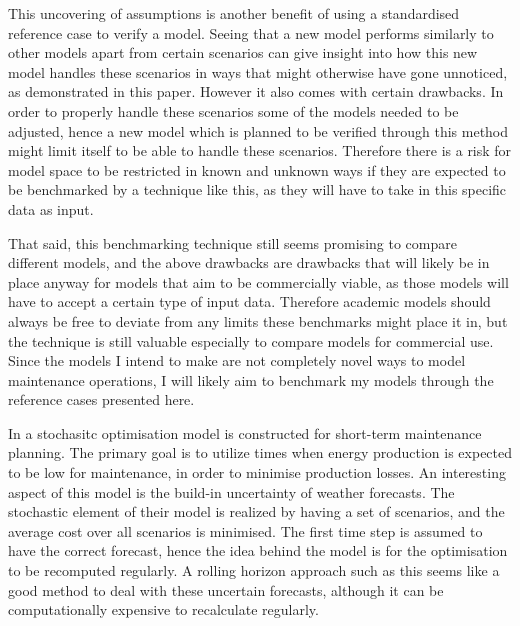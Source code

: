 \documentclass[a4paper,12pt]{article}
\begin{document}
This uncovering of assumptions is another benefit of using a standardised reference case to verify a model. Seeing that a new model performs similarly to other models apart from certain scenarios can give insight into how this new model handles these scenarios in ways that might otherwise have gone unnoticed, as demonstrated in this paper. However it also comes with certain drawbacks. In order to properly handle these scenarios some of the models needed to be adjusted, hence a new model which is planned to be verified through this method might limit itself to be able to handle these scenarios. Therefore there is a risk for model space to be restricted in known and unknown ways if they are expected to be benchmarked by a technique like this, as they will have to take in this specific data as input. 

That said, this benchmarking technique still seems promising to compare different models, and the above drawbacks are drawbacks that will likely be in place anyway for models that aim to be commercially viable, as those models will have to accept a certain type of input data. Therefore academic models should always be free to deviate from any limits these benchmarks might place it in, but the technique is still valuable especially to compare models for commercial use. Since the models I intend to make are not completely novel ways to model maintenance operations, I will likely aim to benchmark my models through the reference cases presented here.  

\bigskip

In \cite{besnard2011stochastic} a stochasitc optimisation model is constructed for short-term maintenance planning. The primary goal is to utilize times when energy production is expected to be low for maintenance, in order to minimise production losses. An interesting aspect of this model is the build-in uncertainty of weather forecasts. The stochastic element of their model is realized by having a set of scenarios, and the average cost over all scenarios is minimised. The first time step is assumed to have the correct forecast, hence the idea behind the model is for the optimisation to be recomputed regularly. A rolling horizon approach such as this seems like a good method to deal with these uncertain forecasts, although it can be computationally expensive to recalculate regularly. 

\bigskip
\end{document}

